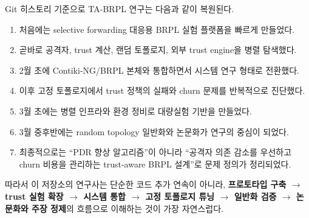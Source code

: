 \documentclass[12pt,a4paper]{article}
\begin{document}
Git 히스토리 기준으로 TA-BRPL 연구는 다음과 같이 복원된다.

\begin{enumerate}[leftmargin=1.5em]
\item 처음에는 selective forwarding 대응용 BRPL 실험 플랫폼을 빠르게 만들었다.
\item 곧바로 공격자, trust 계산, 랜덤 토폴로지, 외부 trust engine을 병렬 탐색했다.
\item 2월 초에 Contiki-NG/BRPL 본체와 통합하면서 시스템 연구 형태로 전환했다.
\item 이후 고정 토폴로지에서 trust 정책의 실패와 churn 문제를 반복적으로 진단했다.
\item 3월 초에는 병렬 인프라와 환경 정비로 대량실험 기반을 만들었다.
\item 3월 중후반에는 random topology 일반화와 논문화가 연구의 중심이 되었다.
\item 최종적으로는 ``PDR 향상 알고리즘''이 아니라
``공격자 의존 감소를 우선하고 churn 비용을 관리하는 trust-aware BRPL 설계''로
문제 정의가 정리되었다.
\end{enumerate}

따라서 이 저장소의 연구사는 단순한 코드 추가 연속이 아니라,
\textbf{프로토타입 구축 $\rightarrow$ trust 실험 확장 $\rightarrow$ 시스템 통합
$\rightarrow$ 고정 토폴로지 튜닝 $\rightarrow$ 일반화 검증 $\rightarrow$ 논문화와
주장 정제}의 흐름으로 이해하는 것이 가장 자연스럽다.
\end{document}
